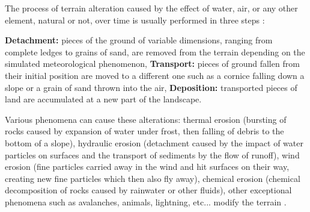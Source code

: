 The process of terrain alteration caused by the effect of water, air, or any other element, natural or not, over time is usually performed in three steps \cite{Neidhold2005}: 
\begin{Itemize}
    \Item{} \textbf{Detachment:} pieces of the ground of variable dimensions, ranging from complete ledges to grains of sand, are removed from the terrain depending on the simulated meteorological phenomenon, 
    \Item{} \textbf{Transport:} pieces of ground fallen from their initial position are moved to a different one such as a cornice falling down a slope or a grain of sand thrown into the air, 
    \Item{} \textbf{Deposition:} transported pieces of land are accumulated at a new part of the landscape. 
\end{Itemize}

Various phenomena can cause these alterations: thermal erosion (bursting of rocks caused by expansion of water under frost, then falling of debris to the bottom of a slope), hydraulic erosion (detachment caused by the impact of water particles on surfaces and the transport of sediments by the flow of runoff), wind erosion (fine particles carried away in the wind and hit surfaces on their way, creating new fine particles which then also fly away), chemical erosion (chemical decomposition of rocks caused by rainwater or other fluids), other exceptional phenomena such as avalanches, animals, lightning, etc... modify the terrain \cite{Cordonnier2017a, Argudo2020, Cordonnier2018, Cordonnier2017b,Cordonnier2023}.


